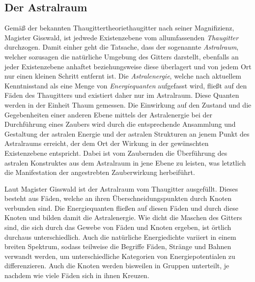 \documentclass[a5paper,8pt]{book}
\begin{document}
\subsection{Der Astralraum}
\begin{multicols}{2}
Gemäß der bekannten Thau\-git\-ter\-theo\-riethaugitter nach seiner Magnifizienz, Magister Gisswald, ist
jedwede Existenzebene vom allumfassenden \textit{Thaugitter} durchzogen. Damit einher geht die Tatsache, dass der
sogenannte \textit{Astralraum}, welcher sozusagen die natürliche Umgebung des Gitters darstellt, ebenfalls an jeder
Existenzebene anhaftet beziehungsweise diese überlagert und von jedem Ort nur einen kleinen Schritt
entfernt ist. Die \textit{Astralenergie}, welche nach aktuellem Kenntnisstand als eine Menge von
\textit{Energiequanten} aufgefasst wird, fließt auf den Fäden des Thaugitters und existiert daher nur im
Astralraum. Diese Quanten werden in der Einheit Thaum gemessen. Die Einwirkung auf den Zustand und die
Gegebenheiten einer anderen Ebene mittels der Astralenergie bei der Durchführung eines Zaubers wird durch die
entsprechende Ansammlung und Gestaltung der astralen Energie und der astralen Strukturen an jenem Punkt des
Astralraums erreicht, der dem Ort der Wirkung in der gewünschten Existenzebene entspricht. Dabei ist vom
Zaubernden die Überführung des astralen Konstruktes aus dem Astralraum in jene Ebene zu leisten, was
letztlich die Manifestation der angestrebten Zauberwirkung herbeiführt.

Laut Magister Gisswald ist der Astralraum vom Thaugitter ausgefüllt. Dieses besteht aus Fäden, welche an
ihren Überschneidungspunkten durch Knoten verbunden sind. Die Energiequanten fließen auf diesen Fäden und durch diese
Knoten und bilden damit die Astralenergie. Wie dicht die Maschen des Gitters sind, die sich durch das Gewebe von Fäden
und Knoten ergeben, ist örtlich durchaus unterschiedlich. Auch die natürliche Energiedichte variiert in einem breiten
Spektrum, sodass teilweise die Begriffe Fäden, Stränge und Bahnen verwandt werden, um unterschiedliche Kategorien
von Energiepotentialen zu differenzieren. Auch die Knoten werden bisweilen in Gruppen unterteilt, je nachdem wie viele
Fäden sich in ihnen Kreuzen.


\end{multicols}
\end{document}
